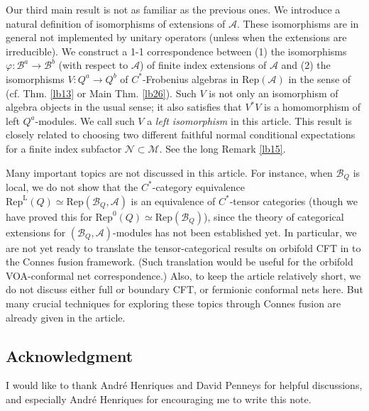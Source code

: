 \documentclass[11pt,b5paper,notitlepage]{article}
\theoremstyle{definition}
\theoremstyle{plain}
\newcommand{\mc}{\mathcal}
\newcommand{\Rep}{\mathrm{Rep}}
\newcommand{\RepA}{\mathrm{Rep}(\mathcal A)}
\newcommand{\RepL}{\mathrm{Rep}^{\mathrm{L}}}
\numberwithin{equation}{section}
\begin{document}
	
Our third main result is not as familiar as the previous ones. We introduce a natural definition of isomorphisms of extensions of $\mc A$. These isomorphisms are in general not implemented by unitary operators (unless when the extensions are irreducible).  We construct a 1-1 correspondence between (1) the isomorphisms $\varphi:\mc B^a\rightarrow\mc B^b$ (with respect to $\mc A$)  of finite index extensions of $\mc A$ and (2) the isomorphisms $V:Q^a\rightarrow Q^b$ of $C^*$-Frobenius algebras in $\RepA$ in the sense of \cite{NY18} (cf. Thm. \ref{lb13} or Main Thm. \ref{lb26}). Such  $V$ is not only an isomorphism of algebra objects in the usual sense; it also satisfies that $V^*V$ is a homomorphism of left $Q^a$-modules. We call such $V$ a \textit{left isomorphism} in this article. This result is closely related to choosing two different faithful normal conditional expectations for a finite index subfactor $\mc N\subset\mc M$. See the long Remark \ref{lb15}.



Many important topics are not discussed in this article. For instance, when $\mc B_Q$ is local, we do not show that the $C^*$-category equivalence $\RepL(Q)\simeq\Rep(\mc B_Q,\mc A)$ is an equivalence of $C^*$-tensor categories (though we have proved this for $\Rep^0(Q)\simeq \Rep(\mc B_Q)$), since the theory of categorical extensions for $(\mc B_Q,\mc A)$-modules has not been established yet. In particular, we are not yet ready to translate the tensor-categorical results on orbifold CFT in \cite{Mug05} to the Connes fusion framework. (Such translation would be useful for the orbifold VOA-conformal net correspondence.) Also, to keep the article relatively short, we do not discuss either full or boundary CFT, or  fermionic conformal nets here. But many crucial  techniques for exploring these topics through Connes fusion are already given in the article.











\subsection*{Acknowledgment}

I would like to thank Andr\'e Henriques and David Penneys for helpful discussions, and especially Andr\'e Henriques for encouraging me to write this note.

	
	
\end{document}

